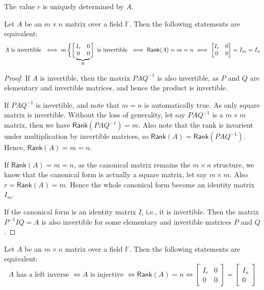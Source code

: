 \documentclass[
	11pt, %
	fleqn, %
	a4paper, %
]{LegrandOrangeBook}
\newcommand{\F}{\mathbb{F}} %
\newcommand{\rank}[1]{\mathsf{Rank}(#1)} %
\begin{document}
\begin{remark}
    The value $r$ is uniquely determined by $A$.
\end{remark}

\def\matriximg{%
    \begin{matrix}
        I_r & 0 \\
        0 & 0 
    \end{matrix}
}

\begin{proposition}
    Let $A$ be an $m \times n$ matrix over a field $\F$. Then the following statements are equivalent:
    \[
        A \text{ is invertible } \iff m \left\{\left[\vphantom{\matriximg}\right.\right.\kern-2\nulldelimiterspace
        \underbrace{\matriximg}_{\text{\normalsize $n$}}\kern-\nulldelimiterspace\left.\vphantom{\matriximg}\right] \text{ is invertible } \iff \rank{A} = m = n \iff \begin{bmatrix}
            I_r & 0 \\
            0 & 0
        \end{bmatrix} = I_m = I_n
    \]
\end{proposition}

\begin{proof}
    If $A$ is invertible, then the matrix $PAQ^{-1}$ is also invertible, as $P$ and $Q$ are elementary and invertible matrices, and hence the product is invertible. 
    
    If $PAQ^{-1}$ is invertible, and note that $m = n$ is automatically true. As only square matrix is invertible. Without the loss of generality, let say $PAQ^{-1}$ is a $m \times m$ matrix, then we have $\rank{PAQ^{-1}} = m$. Also note that the rank is invarient under multiplication by invertible matrices, so $\rank{A} = \rank{PAQ^{-1}}$. Hence, $\rank{A} = m = n$.

    If $\rank{A} = m = n$, as the canonical matrix remains the $m \times n$ structure, we know that the canonical form is actually a square matrix, let say $m \times m$. Also $r = \rank{A} = m$. Hence the whole canonical form become an identity matrix $I_m$.

    If the canonical form is an identity matrix $I$, i.e., it is invertible. Then the matrix $P^{-1}IQ = A$ is also invertible for some elementary and invertible matrices $P$ and $Q$.
\end{proof}

\begin{proposition}
    Let $A$ be an $m \times n$ matrix over a field $\F$. Then the following statements are equivalent:
    \[
        A \text{ has a left inverse } \iff A \text{ is injective } \iff \rank{A} = n \iff \begin{bmatrix}
            I_r & 0 \\
            0 & 0
        \end{bmatrix} = \begin{bmatrix}
            I_n \\
            0
        \end{bmatrix}
    \]
\end{proposition}
\end{document}
